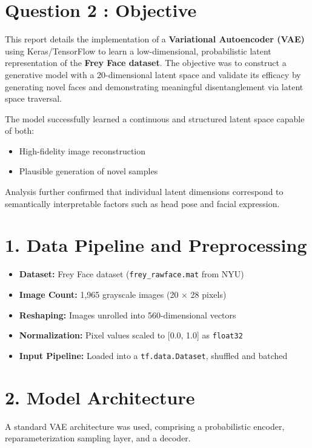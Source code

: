 \documentclass[12pt]{article}
\begin{document}
\newpage
\section*{Question 2 : Objective}
This report details the implementation of a \textbf{Variational Autoencoder (VAE)} using Keras/TensorFlow to learn a low-dimensional, probabilistic latent representation of the \textbf{Frey Face dataset}. The objective was to construct a generative model with a 20-dimensional latent space and validate its efficacy by generating novel faces and demonstrating meaningful disentanglement via latent space traversal.

The model successfully learned a continuous and structured latent space capable of both:
\begin{itemize}
    \item High-fidelity image reconstruction
    \item Plausible generation of novel samples
\end{itemize}
Analysis further confirmed that individual latent dimensions correspond to semantically interpretable factors such as head pose and facial expression.

\section*{1. Data Pipeline and Preprocessing}

\begin{itemize}
    \item \textbf{Dataset:} Frey Face dataset (\texttt{frey\_rawface.mat} from NYU)
    \item \textbf{Image Count:} 1,965 grayscale images (20 $\times$ 28 pixels)
    \item \textbf{Reshaping:} Images unrolled into 560-dimensional vectors
    \item \textbf{Normalization:} Pixel values scaled to [0.0, 1.0] as \texttt{float32}
    \item \textbf{Input Pipeline:} Loaded into a \texttt{tf.data.Dataset}, shuffled and batched
\end{itemize}

\section*{2. Model Architecture}

A standard VAE architecture was used, comprising a probabilistic encoder, reparameterization sampling layer, and a decoder.
\end{document}
